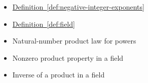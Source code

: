 \begin{dependencies}
\begin{itemize}
  \item \hyperref[def:negative-integer-exponents]{Definition~\ref*{def:negative-integer-exponents}}
  \item \hyperref[def:field]{Definition~\ref*{def:field}}
  \item Natural-number product law for powers
  \item Nonzero product property in a field
  \item Inverse of a product in a field
\end{itemize}
\end{dependencies}